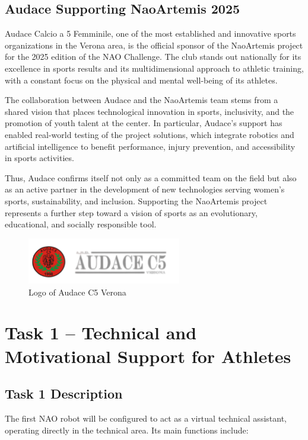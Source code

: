 \documentclass{optica-article}
\begin{document}
\subsection{Audace Supporting NaoArtemis 2025}
Audace Calcio a 5 Femminile, one of the most established and innovative sports organizations in the Verona area, is the official sponsor of the NaoArtemis project for the 2025 edition of the NAO Challenge. The club stands out nationally for its excellence in sports results and its multidimensional approach to athletic training, with a constant focus on the physical and mental well-being of its athletes.

The collaboration between Audace and the NaoArtemis team stems from a shared vision that places technological innovation in sports, inclusivity, and the promotion of youth talent at the center. In particular, Audace's support has enabled real-world testing of the project solutions, which integrate robotics and artificial intelligence to benefit performance, injury prevention, and accessibility in sports activities.

Thus, Audace confirms itself not only as a committed team on the field but also as an active partner in the development of new technologies serving women's sports, sustainability, and inclusion. Supporting the NaoArtemis project represents a further step toward a vision of sports as an evolutionary, educational, and socially responsible tool.

\begin{figure}[H]
    \centering
    \includegraphics[width=0.6\textwidth]{figures/audace.png}
    \caption{Logo of Audace C5 Verona}
    \label{fig:audace_logo}
\end{figure}

\bigskip
\section{Task 1 -- Technical and Motivational Support for Athletes}

\subsection{Task 1 Description}
The first NAO robot will be configured to act as a virtual technical assistant, operating directly in the technical area. Its main functions include:
\end{document}
